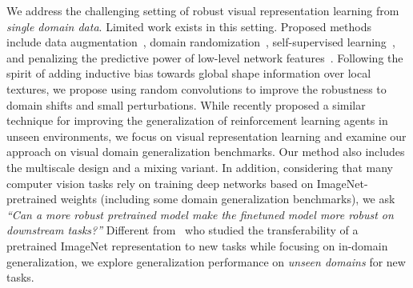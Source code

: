 \documentclass{article} \usepackage{iclr2021_conference,times}
\begin{document}
We address the challenging setting of robust visual representation learning from \emph{single domain data}. Limited work exists in this setting. Proposed methods include data augmentation~\citep{volpi2018generalizing, qiao2020learning, geirhos2018imagenettrained}, domain randomization~\citep{tobin2017domain,yue2019domain}, self-supervised learning~\citep{carlucci2019jigen}, and penalizing the predictive power of low-level network features~\citep{wang2019learning}. Following the spirit of adding inductive bias towards global shape information over local textures, we propose using random convolutions to improve the robustness to domain shifts and small perturbations. While recently \citet{lee2020network} proposed a similar technique for improving the generalization of reinforcement learning agents in unseen environments, we focus on visual representation learning and examine our approach on visual domain generalization benchmarks. Our method also includes the multiscale design and a mixing variant.
In addition, considering that many computer vision tasks rely on training deep networks based on ImageNet-pretrained weights (including some domain generalization benchmarks), we ask \emph{``Can a more robust pretrained model make the finetuned model more robust on downstream tasks?''} Different from~\citep{kornblith2019better,salman2020adversarially} who studied the transferability of a pretrained ImageNet representation to new tasks while focusing on in-domain generalization, we explore generalization performance on \emph{unseen domains} for new tasks.
\end{document}
